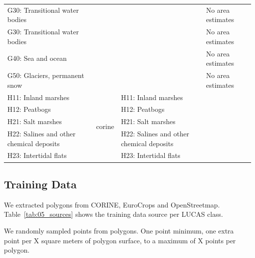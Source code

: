 \begin{table}[]
\begin{tabular}{l{2cm}lll}
G30: Transitional water bodies                &                         &                                                       & No area estimates                                         \\
G30: Transitional water bodies                &                         &                                                       & No area estimates                                         \\
G40: Sea and ocean                            &                         &                                                       & No area estimates                                         \\
G50: Glaciers, permanent snow                 &                         &                                                       & No area estimates                                         \\
H11: Inland marshes                           & \multirow{5}{*}{corine} & H11: Inland marshes                                   &                                                           \\
H12: Peatbogs                                 &                         & H12: Peatbogs                                         &                                                           \\
H21: Salt marshes                             &                         & H21: Salt marshes                                     &                                                           \\
H22: Salines and other chemical deposits      &                         & H22: Salines and other chemical deposits              &                                                           \\
H23: Intertidal flats                         &                         & H23: Intertidal flats                                 &                                                          
\end{tabular}
\end{table}

\subsection{Training Data}
We extracted polygons from CORINE, EuroCrops and OpenStreetmap. Table~\ref{tab:05_sources} shows the training data source per LUCAS class.

We randomly sampled points from polygons. One point minimum, one extra point per X square meters of polygon surface, to a maximum of X points per polygon.

